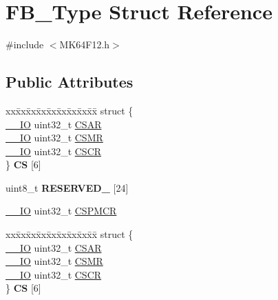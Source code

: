 \hypertarget{structFB__Type}{}\section{F\+B\+\_\+\+Type Struct Reference}
\label{structFB__Type}


{\ttfamily \#include $<$M\+K64\+F12.\+h$>$}

\subsection*{Public Attributes}
\begin{DoxyCompactItemize}
\item 
\begin{tabbing}
xx\=xx\=xx\=xx\=xx\=xx\=xx\=xx\=xx\=\kill
struct \{\\
\>\hyperlink{core__sc300_8h_aec43007d9998a0a0e01faede4133d6be}{\_\_IO} uint32\_t \hyperlink{structFB__Type_abb1101b4dcb8c9dd9f75275f0dd3ab81}{CSAR}\\
\>\hyperlink{core__sc300_8h_aec43007d9998a0a0e01faede4133d6be}{\_\_IO} uint32\_t \hyperlink{structFB__Type_a8af43e05c8447e8a22812399362ec578}{CSMR}\\
\>\hyperlink{core__sc300_8h_aec43007d9998a0a0e01faede4133d6be}{\_\_IO} uint32\_t \hyperlink{structFB__Type_a61b62c31da70f4173f0b4ef38aae0489}{CSCR}\\
\} {\bfseries CS} \mbox{[}6\mbox{]}\hypertarget{structFB__Type_ac66fc63056e21e44d8054b5692ffbd01}{}\label{structFB__Type_ac66fc63056e21e44d8054b5692ffbd01}
\\

\end{tabbing}\item 
uint8\+\_\+t {\bfseries R\+E\+S\+E\+R\+V\+E\+D\+\_} \mbox{[}24\mbox{]}\hypertarget{structFB__Type_a494a6ea70d528833c3c3ff86f74f9e12}{}\label{structFB__Type_a494a6ea70d528833c3c3ff86f74f9e12}

\item 
\hyperlink{core__sc300_8h_aec43007d9998a0a0e01faede4133d6be}{\+\_\+\+\_\+\+IO} uint32\+\_\+t \hyperlink{structFB__Type_aa557896c8a786ee5e7bebdf341369d02}{C\+S\+P\+M\+CR}
\item 
\begin{tabbing}
xx\=xx\=xx\=xx\=xx\=xx\=xx\=xx\=xx\=\kill
struct \{\\
\>\hyperlink{core__sc300_8h_aec43007d9998a0a0e01faede4133d6be}{\_\_IO} uint32\_t \hyperlink{structFB__Type_abb1101b4dcb8c9dd9f75275f0dd3ab81}{CSAR}\\
\>\hyperlink{core__sc300_8h_aec43007d9998a0a0e01faede4133d6be}{\_\_IO} uint32\_t \hyperlink{structFB__Type_a8af43e05c8447e8a22812399362ec578}{CSMR}\\
\>\hyperlink{core__sc300_8h_aec43007d9998a0a0e01faede4133d6be}{\_\_IO} uint32\_t \hyperlink{structFB__Type_a61b62c31da70f4173f0b4ef38aae0489}{CSCR}\\
\} {\bfseries CS} \mbox{[}6\mbox{]}\hypertarget{structFB__Type_a4eefcef0f9d7819fd557256f2a9a8f20}{}\label{structFB__Type_a4eefcef0f9d7819fd557256f2a9a8f20}
\\


\end{tabbing}
\end{DoxyCompactItemize}
